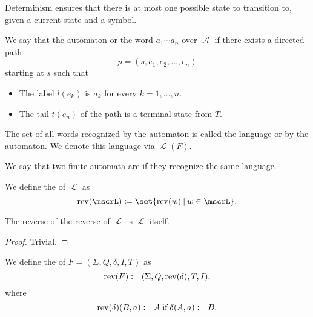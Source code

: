 \begin{definition}
\begin{thmenum}
    Determinism ensures that there is at most one possible state to transition to, given a current state and a symbol.

     We say that the automaton  or  the \hyperref[def:formal_language/word]{word} \( a_1 \cdots a_n \) over \( \mscrA \) if there exists a directed path
    \begin{equation*}
      p = (s, e_1, e_2, \ldots, e_n)
    \end{equation*}
    starting at \( s \) such that
    \begin{itemize}
      \item The label \( l(e_k) \) is \( a_k \) for every \( k = 1, \ldots, n \).
      \item The tail \( t(e_n) \) of the path is a terminal state from \( T \).
    \end{itemize}

     The set of all words recognized by the automaton is called the language  or  by the automaton. We denote this language via \( \mscrL(F) \).

     We say that two finite automata are  if they recognize the same language.
  \end{thmenum}
\end{definition}

\begin{definition}\label{def:reverse_language}
  We define the  of \( \mscrL \) as
  \begin{equation*}
    \op{rev}(\mscrL) \coloneqq \set{ \op{rev}(w) \given w \in \mscrL }.
  \end{equation*}
\end{definition}

\begin{proposition}\label{thm:reverse_language_involution}
  The \hyperref[def:reverse_language]{reverse} of the reverse of \( \mscrL \) is \( \mscrL \) itself.
\end{proposition}
\begin{proof}
  Trivial.
\end{proof}

\begin{definition}\label{def:reverse_finite_automaton}\mimprovised
  We define the  of \( F = (\Sigma, Q, \delta, I, T) \) as
  \begin{equation*}
    \operatorname{rev}(F) \coloneqq (\Sigma, Q, \operatorname{rev}(\delta), T, I),
  \end{equation*}
  where
  \begin{equation*}
    \op{rev}(\delta)(B, a) \coloneqq A \T{if} \delta(A, a) \coloneqq B.
  \end{equation*}
\end{definition}

